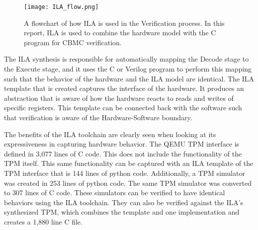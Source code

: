 \begin{figure}
  \centering
  \texttt{[image: ILA\_flow.png]}
  \caption[ILA Verification Flowchart]{A flowchart of how ILA is used in the Verification process.
  In this report, ILA is used to combine the hardware model with the C program for CBMC verification.}
  \label{fig:ILA_flow}
\end{figure}

The ILA synthesis is responsible for automatically mapping the Decode stage to
the Execute stage, and it uses the C or Verilog program to perform this mapping
such that the behavior of the hardware and the ILA model are identical.
The ILA template that is created captures the interface of the hardware.
It produces an abstraction that is aware of how the hardware reacts to reads and
writes of specific registers.
This template can be connected back with the software such that verification is
aware of the Hardware-Software boundary.

The benefits of the ILA toolchain are clearly seen when looking at its
expressiveness in capturing hardware behavior.
The QEMU TPM interface is defined in 3,077 lines of C code.
This does not include the functionality of the TPM itself.
This same functionality can be captured with an ILA template of the TPM
interface that is 144 lines of python code.
Additionally, a TPM simulator was created in 253 lines of python code.
The same TPM simulator was converted to 307 lines of C code.
These simulators can be verified to have identical behaviors using the ILA
toolchain.
They can also be verified against the ILA's synthesized TPM, which combines the
template and one implementation and creates a 1,880 line C file.
